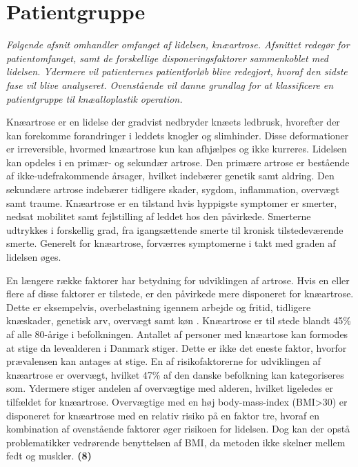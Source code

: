 \section{Patientgruppe}
\textit{Følgende afsnit omhandler omfanget af lidelsen, knæartrose. Afsnittet redegør for patientomfanget, samt de forskellige disponeringsfaktorer sammenkoblet med lidelsen. Ydermere vil patienternes patientforløb blive redegjort, hvoraf den sidste fase vil blive analyseret. Ovenstående vil danne grundlag for at klassificere en patientgruppe til knæalloplastik operation.}

Knæartrose er en lidelse der gradvist nedbryder knæets ledbrusk, hvorefter der kan forekomme forandringer i leddets knogler og slimhinder. Disse deformationer er irreversible, hvormed knæartrose kun kan afhjælpes og ikke kurreres. Lidelsen kan opdeles i en primær- og sekundær artrose. Den primære artrose er bestående af ikke-udefrakommende årsager, hvilket indebærer genetik samt aldring. Den sekundære artrose indebærer tidligere skader, sygdom, inflammation, overvægt samt traume. Knæartrose er en tilstand hvis hyppigste symptomer er smerter, nedsat mobilitet samt fejlstilling af leddet hos den påvirkede. Smerterne udtrykkes i forskellig grad, fra igangsættende smerte til kronisk tilstedeværende smerte. Generelt for knæartrose, forværres symptomerne i takt med graden af lidelsen øges. \citep{Lind2016b}

En længere række faktorer har betydning for udviklingen af artrose. Hvis en eller flere af disse faktorer er tilstede, er den påvirkede mere disponeret for knæartrose. Dette er eksempelvis, overbelastning igennem arbejde og fritid, tidligere knæskader, genetisk arv, overvægt samt køn \citep{brostrom2012}. Knæartrose er til stede blandt 45\% af alle 80-årige i befolkningen. Antallet af personer med knæartose kan formodes at stige da levealderen i Danmark stiger. Dette er ikke det eneste faktor, hvorfor prævalensen kan antages at stige. En af risikofaktorerne for udviklingen af knæartrose er overvægt, hvilket 47\% af den danske befolkning kan kategoriseres som. Ydermere stiger andelen af overvægtige med alderen, hvilket ligeledes er tilfældet for knæartrose. Overvægtige med en høj body-mass-index (BMI>30\citep{definitionfedme1999}) er disponeret for knæartrose med en relativ risiko på en faktor tre, hvoraf en kombination af ovenstående faktorer øger risikoen for lidelsen. Dog kan der opstå problematikker vedrørende benyttelsen af BMI, da metoden ikke skelner mellem fedt og muskler. \textbf{(8)} \citep{brostrom2012} \citep{Vestergaard2014} \citep{Vestergaard2016} \citep{Lind2016} \citep{Lind2016b}


